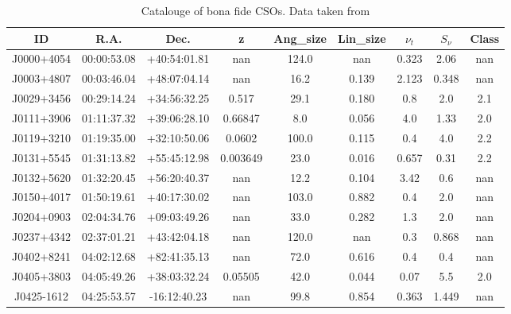 \begin{table}[H]
    \centering
    \caption{Catalouge of bona fide CSOs. Data taken from \cite{kiehlmann2023compact}}
    \label{tab:CSO_sources}
    \begin{tabular}{@{}ccccccccc@{}}
        \toprule
        ID & R.A. & Dec. & z & Ang\_size & Lin\_size & $\nu_t$ & $S_\nu$ & Class \\ \midrule
        J0000+4054 & 00:00:53.08 & +40:54:01.81 & nan & 124.0 & nan & 0.323 & 2.06 & nan \\
        J0003+4807 & 00:03:46.04 & +48:07:04.14 & nan & 16.2 & 0.139 & 2.123 & 0.348 & nan \\
        J0029+3456 & 00:29:14.24 & +34:56:32.25 & 0.517 & 29.1 & 0.180 & 0.8 & 2.0 & 2.1 \\
        J0111+3906 & 01:11:37.32 & +39:06:28.10 & 0.66847 & 8.0 & 0.056 & 4.0 & 1.33 & 2.0 \\
        J0119+3210 & 01:19:35.00 & +32:10:50.06 & 0.0602 & 100.0 & 0.115 & 0.4 & 4.0 & 2.2 \\
        J0131+5545 & 01:31:13.82 & +55:45:12.98 & 0.003649 & 23.0 & 0.016 & 0.657 & 0.31 & 2.2 \\
        J0132+5620 & 01:32:20.45 & +56:20:40.37 & nan & 12.2 & 0.104 & 3.42 & 0.6 & nan \\
        J0150+4017 & 01:50:19.61 & +40:17:30.02 & nan & 103.0 & 0.882 & 0.4 & 2.0 & nan \\
        J0204+0903 & 02:04:34.76 & +09:03:49.26 & nan & 33.0 & 0.282 & 1.3 & 2.0 & nan \\
        J0237+4342 & 02:37:01.21 & +43:42:04.18 & nan & 120.0 & nan & 0.3 & 0.868 & nan \\
        J0402+8241 & 04:02:12.68 & +82:41:35.13 & nan & 72.0 & 0.616 & 0.4 & 0.4 & nan \\
        J0405+3803 & 04:05:49.26 & +38:03:32.24 & 0.05505 & 42.0 & 0.044 & 0.07 & 5.5 & 2.0 \\
        J0425-1612 & 04:25:53.57 & -16:12:40.23 & nan & 99.8 & 0.854 & 0.363 & 1.449 & nan \\

\end{tabular}
\end{table}
